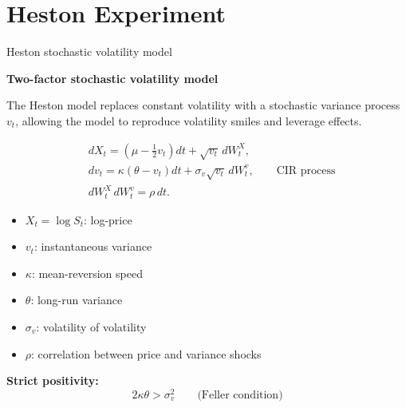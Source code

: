 \section{Heston Experiment}

\begin{frame}{Heston stochastic volatility model}

\textbf{Two-factor stochastic volatility model}

The Heston model replaces constant volatility with a stochastic
variance process $v_t$, allowing the model to reproduce volatility
smiles and leverage effects.

\begin{equation}
\begin{aligned}
&dX_t
= \left(\mu-\frac{1}{2}v_t\right)dt
+ \sqrt{v_t}\,dW_t^X,\\
&dv_t
= \kappa(\theta-v_t)dt
+ \sigma_v\sqrt{v_t}\,dW_t^v, \qquad \text{CIR process}\\
&dW_t^X\,dW_t^v
= \rho\,dt.
\end{aligned}
\end{equation}

\vspace{0.1cm}

\begin{itemize}
    \item $X_t=\log S_t$: log-price
    \item $v_t$: instantaneous variance
    \item $\kappa$: mean-reversion speed
    \item $\theta$: long-run variance
    \item $\sigma_v$: volatility of volatility
    \item $\rho$: correlation between price and variance shocks
\end{itemize}

\vspace{0.05cm}

\textbf{Strict positivity:}
\[
2\kappa\theta > \sigma_v^2
\qquad\text{(Feller condition)}
\]

\end{frame}




